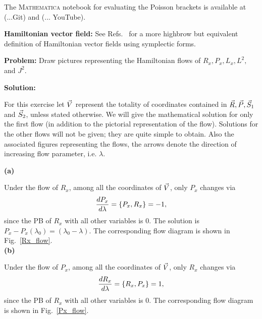 The \textsc{Mathematica} notebook for evaluating the Poisson 
brackets is available at (...Git) and (... YouTube).




\hfill \break


\begin{definition}[label=def:B]
\textbf{Hamiltonian vector field:}
See Refs.~\cite{jose, arnold} for a more highbrow but
equivalent definition of Hamiltonian vector fields
using symplectic forms.
\end{definition}

\hfill \break




\begin{Exercise}    \label{exercise-2}
\textbf{Problem:}  Draw pictures representing the Hamiltonian
flows of $R_x, P_x, L_x, L^2,$ and $J^2$.



\textbf{Solution:} 

For this exercise let $\vec{V}$ represent the totality of 
coordinates contained in $\vec{R}, \vec{P}, \vec{S}_1$ and $\vec{S}_2$,
unless stated otherwise.
We will give the mathematical
 solution for only the first flow (in addition to the
pictorial representation of the flow).
Solutions for the other flows will not be given; they are quite
simple to obtain.
Also the associated figures representing the flows,
the arrows denote the direction of
increasing flow parameter, i.e. $\lambda$.






\textbf{(a)}

Under the flow of $R_x$, among all the
coordinates of $\vec{V}$, only $P_x$ changes via
\begin{align}
\frac{d P_x}{d \lambda}  =  \left\lbrace P_x, R_x \right\rbrace = -1,
\end{align}
since the PB of $R_x$ with all other variables is 0. 
The solution is $ P_x - P_x(\lambda_0) = (\lambda_0 -  \lambda).$
The  corresponding flow diagram is shown in
Fig.~\ref{Rx_flow}.\\




\textbf{(b)}

Under the flow of $P_x$, among all the
coordinates of $\vec{V}$, only $R_x$ changes via
\begin{align}
\frac{d R_x}{d \lambda}  =  \left\lbrace R_x, P_x \right\rbrace = 1,
\end{align}
since the PB of $R_x$ with all other variables is 0. The 
corresponding flow diagram is shown in
Fig.~\ref{Px_flow}.






\end{Exercise}
